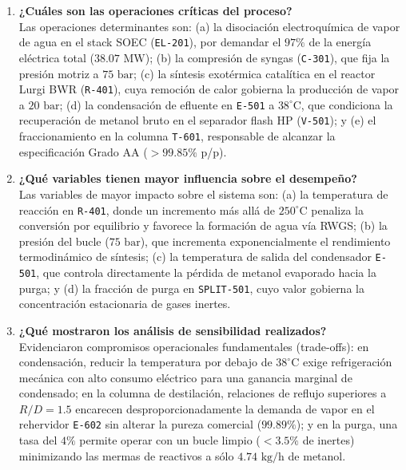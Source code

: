 \documentclass[10pt,letterpaper]{article}
\begin{document}
\begin{enumerate}[leftmargin=*,itemsep=6pt]
    \item \textbf{¿Cuáles son las operaciones críticas del proceso?}\\
    Las operaciones determinantes son: (a) la disociación electroquímica de vapor de agua en el stack SOEC (\texttt{EL-201}), por demandar el $97\%$ de la energía eléctrica total ($38.07\text{ MW}$); (b) la compresión de syngas (\texttt{C-301}), que fija la presión motriz a $75\text{ bar}$; (c) la síntesis exotérmica catalítica en el reactor Lurgi BWR (\texttt{R-401}), cuya remoción de calor gobierna la producción de vapor a $20\text{ bar}$; (d) la condensación de efluente en \texttt{E-501} a $38^\circ\text{C}$, que condiciona la recuperación de metanol bruto en el separador flash HP (\texttt{V-501}); y (e) el fraccionamiento en la columna \texttt{T-601}, responsable de alcanzar la especificación Grado AA ($>99.85\%$ p/p).

    \item \textbf{¿Qué variables tienen mayor influencia sobre el desempeño?}\\
    Las variables de mayor impacto sobre el sistema son: (a) la temperatura de reacción en \texttt{R-401}, donde un incremento más allá de $250^\circ\text{C}$ penaliza la conversión por equilibrio y favorece la formación de agua vía RWGS; (b) la presión del bucle ($75\text{ bar}$), que incrementa exponencialmente el rendimiento termodinámico de síntesis; (c) la temperatura de salida del condensador \texttt{E-501}, que controla directamente la pérdida de metanol evaporado hacia la purga; y (d) la fracción de purga en \texttt{SPLIT-501}, cuyo valor gobierna la concentración estacionaria de gases inertes.

    \item \textbf{¿Qué mostraron los análisis de sensibilidad realizados?}\\
    Evidenciaron compromisos operacionales fundamentales (trade-offs): en condensación, reducir la temperatura por debajo de $38^\circ\text{C}$ exige refrigeración mecánica con alto consumo eléctrico para una ganancia marginal de condensado; en la columna de destilación, relaciones de reflujo superiores a $R/D = 1.5$ encarecen desproporcionadamente la demanda de vapor en el rehervidor \texttt{E-602} sin alterar la pureza comercial ($99.89\%$); y en la purga, una tasa del $4\%$ permite operar con un bucle limpio ($<3.5\%$ de inertes) minimizando las mermas de reactivos a sólo $4.74\text{ kg/h}$ de metanol.


\end{enumerate}
\end{document}
